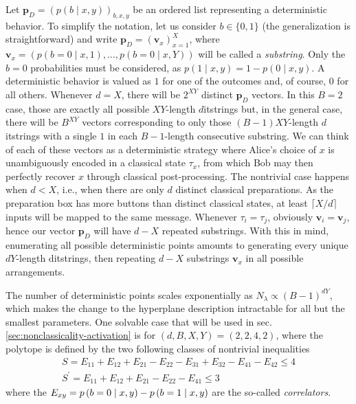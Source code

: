     Let $\mathbf{p}_D = \left( p(b \mid x, y) \right)_{b, x, y}$ be an ordered list representing a deterministic behavior. To simplify the notation, let us consider $b \in \{ 0, 1\}$ (the generalization is straightforward) and write $\mathbf{p}_D = \left( \mathbf{v}_x \right)_{x=1}^X$, where $\mathbf{v}_x = \left( p(b = 0 \mid x, 1), \ldots, p(b = 0 \mid x, Y ) \right)$ will be called a \emph{substring}. Only the $b=0$ probabilities must be considered, as $p(1 \mid x, y) = 1 - p(0 \mid x, y)$. A deterministic behavior is valued as $1$ for one of the outcomes and, of course, $0$ for all others. Whenever $d = X$, there will be $2^{XY}$ distinct $\mathbf{p}_D$ vectors. In this $B=2$ case, those are exactly all possible $XY$-length $d$itstrings but, in the general case, there will be $B^{XY}$ vectors corresponding to only those $(B-1)XY$-length $d$itstrings with a single $1$ in each $B-1$-length consecutive substring. We can think of each of these vectors as a deterministic strategy where Alice's choice of $x$ is unambiguously encoded in a classical state $\tau_x$, from which Bob may then perfectly recover $x$ through classical post-processing. The nontrivial case happens when $d < X$, i.e., when there are only $d$ distinct classical preparations. As the preparation box has more buttons than distinct classical states, at least $\lceil X/d \rceil$ inputs will be mapped to the same message. Whenever $\tau_i = \tau_j$, obviously $\mathbf{v}_i = \mathbf{v}_j$, hence our vector $\mathbf{p}_D$ will have $d - X$ repeated substrings. With this in mind, enumerating all possible deterministic points amounts to generating every unique $dY$-length ditstrings, then repeating $d-X$ substrings $\mathbf{v}_x$ in all possible arrangements.

    The number of deterministic points scales exponentially as $N_\lambda \propto (B-1)^{dY}$, which makes the change to the hyperplane description intractable for all but the smallest parameters. One solvable case that will be used in sec. \ref{sec:nonclassicality-activation} is for $(d,B,X,Y)=(2,2,4,2)$, where the polytope is defined by the two following classes of nontrivial inequalities \cite{poderini_pamcriteria_2020}
    \begin{subequations}
        \begin{gather}
            S = E_{11} + E_{12} + E_{21} - E_{22} - E_{31} + E_{32} - E_{41} - E_{42} \leq 4 \label{eq:inequality-s}\\
            S^\prime = E_{11} + E_{12} + E_{21} - E_{22} - E_{41} \leq 3 
        \end{gather}
    \end{subequations}
    where the $E_{xy}=p \left( b=0 \mid x,y \right)-p \left( b=1 \mid x,y \right)$ are the so-called \emph{correlators}.


